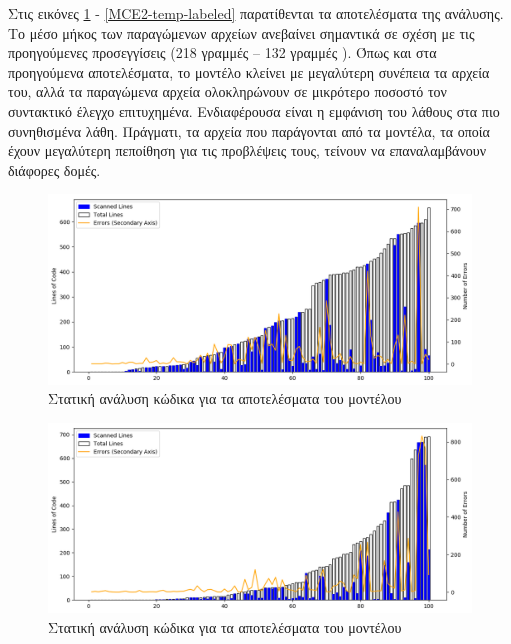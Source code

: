 Στις εικόνες \ref{static-temp-char} - \ref{MCE2-temp-labeled} παρατίθενται τα αποτελέσματα της ανάλυσης.
Το μέσο μήκος των παραγώμενων αρχείων ανεβαίνει σημαντικά σε σχέση με τις προηγούμενες προσεγγίσεις (218 γραμμές  -- 132 γραμμές ).
Όπως και στα προηγούμενα αποτελέσματα, το μοντέλο  κλείνει με μεγαλύτερη συνέπεια τα αρχεία του, αλλά τα παραγώμενα αρχεία ολοκληρώνουν σε μικρότερο ποσοστό τον συντακτικό έλεγχο επιτυχημένα.
Ενδιαφέρουσα είναι η εμφάνιση του λάθους  στα πιο συνηθισμένα λάθη.
Πράγματι, τα αρχεία που παράγονται από τα μοντέλα, τα οποία έχουν μεγαλύτερη πεποίθηση για τις προβλέψεις τους, τείνουν να επαναλαμβάνουν διάφορες δομές.

\begin{figure}
	\includegraphics[width=\textwidth, keepaspectratio]{images/temp-char.png}
	\caption{Στατική ανάλυση κώδικα για τα αποτελέσματα του  μοντέλου}
	\label{static-temp-char}
\end{figure}

\begin{figure}
	\includegraphics[width=\textwidth, keepaspectratio]{images/temp-labeled.png}
	\caption{Στατική ανάλυση κώδικα για τα αποτελέσματα του  μοντέλου}
	\label{static-temp-labeled}
\end{figure}

